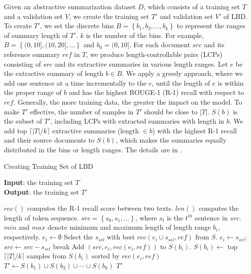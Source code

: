 Given an abstractive summarization dataset $D$, which consists of
a training set $T$ and a validation set $V$, we create the training
set $T'$ and validation set $V'$ of LBD. 
To create $T'$, 
we set the discrete bins $B=\left\{b_1, b_2,...,b_k\right\}$ to represent the ranges of summary length of $T'$. 
$k$ is the number of the bins. 
For example, $B=\left\{(0,10],(10,20],...\right\}$ and $b_0=(0,10]$. 
For each document $src$ and its reference summary $ref$ in $T$,
we produce length-controllable pairs (LCPs) consisting of $src$ and its 
extractive summaries in various length ranges.
Let $e$ be the extractive summary of length $b \in B$. 
We apply a greedy approach,
where we add one sentence at a time incrementally to the $e$, 
until the length of $e$ is within the proper range of $b$ and has the highest 
ROUGE-1 (R-1) recall with respect to $ref$.
Generally, the more training data, the greater the impact on the model.
To make $T'$ effective,
the number of samples in $T'$ should be close to $|T|$.
$S(b)$ is the subset of $T'$, including LCPs with extracted summaries with 
length in $b$. 
We add top $\lceil |T|/k \rceil$ extractive summaries (length $\in b$) 
with the highest R-1 recall and their source documents to $S(b)$,
which makes the summaries equally distributed in the bins or length ranges.
The details are in . 


\begin{algorithm}[th!]
	\caption{Creating Training Set of LBD}
	\label{alg:data}
	\scriptsize
	\textbf{Input}: the training set $T$ \\
	\textbf{Output}:  the training set $T'$ \\
	\begin{algorithmic}[1] %
		\STATE $rec()$ computes the R-1 recall score between two texts.
		\STATE $len()$ computes the length of token sequence.
		\STATE $src=\left\{s_0, s_1,...\right\}$, where $s_t$ is the $t^{th}$ sentence in $src$.
		\STATE $min$ and $max$ denote minimum and maximum length of length range $b_i$, respectively.
		\STATE $e_i \leftarrow \emptyset$
	    \STATE Select the $s_{sel}$ with best $rec(e_i\cup s_{sel}, ref)$ from $S$.
		\STATE $e_i \leftarrow s_{sel}$; $src \leftarrow src-s_{sel}$
		\ELSE 
		\STATE break
		\ENDIF
		\ENDWHILE
		\STATE Add $(src, e_i, rec(e_i,ref))$ to $S(b_i)$.
		\ENDIF
		\ENDFOR
		\ENDFOR
		\STATE $S(b_i) \leftarrow$ top $\lceil |T|/k \rceil$ samples from $S(b_i)$ sorted by $rec(e_i,ref)$
		\STATE $T' \leftarrow S(b_1) \cup S(b_2)\cup \cdots \cup S(b_k)$
		\RETURN $T'$
	\end{algorithmic}
\end{algorithm}


